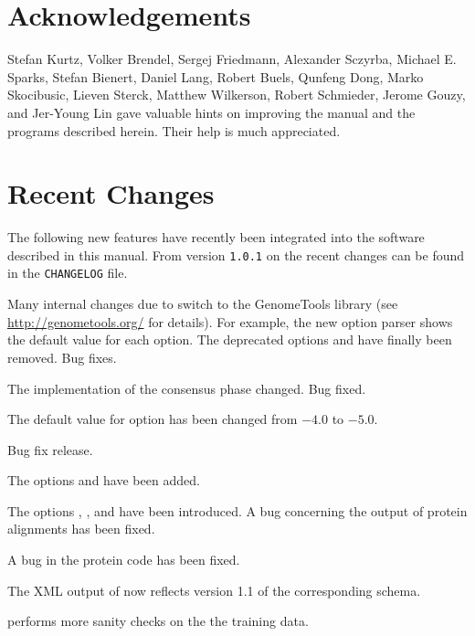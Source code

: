 \documentclass[11pt,a4paper,titlepage]{article}
\begin{document}
\section{Acknowledgements}
Stefan Kurtz,
Volker Brendel,
Sergej Friedmann,
Alexander Sczyrba,
Michael E. Sparks,
Stefan Bienert,
Daniel Lang,
Robert Buels,
Qunfeng Dong,
Marko Skocibusic,
Lieven Sterck,
Matthew Wilkerson,
Robert Schmieder,
Jerome Gouzy,
and Jer-Young Lin
gave valuable hints on improving the manual and the
programs described herein. Their help is much appreciated.


\section{Recent Changes}
The following new features have recently been integrated into the
software described in this manual.
From version \texttt{1.0.1} on the recent changes can be found in the
\texttt{CHANGELOG} file.

Many internal changes due to switch to the GenomeTools library (see
\url{http://genometools.org/} for details). For example, the new option parser
shows the default value for each option.
The deprecated options  and 
have finally been removed. Bug fixes.

The implementation of the consensus phase changed. Bug fixed.

The default value for option  has been changed from $-4.0$
to $-5.0$.

Bug fix release.

The options  and  have been added.

The options , , and
 have been introduced. A bug concerning the output of
protein alignments has been fixed.

A bug in the protein code has been fixed.

The XML output of \Gth now reflects version 1.1 of the corresponding schema.

\Callgthbssmbuild performs more sanity checks on the the training data.
\end{document}

